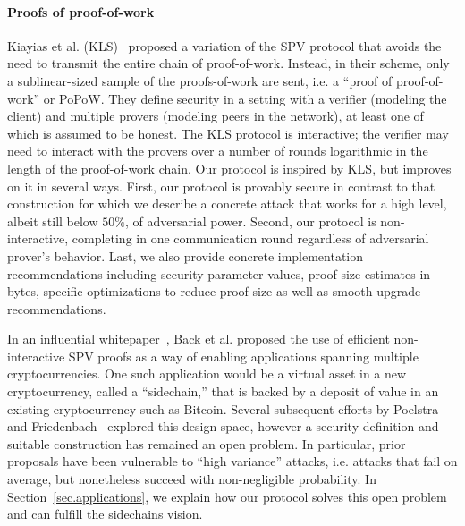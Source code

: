 \paragraph{Proofs of proof-of-work}
Kiayias et al. (KLS)~\cite{KLS} proposed a variation of the SPV protocol that
avoids the need to transmit the entire chain of proof-of-work. Instead, in
their scheme, only a sublinear-sized sample of the proofs-of-work are sent, i.e.
a ``proof of proof-of-work'' or PoPoW. They define security in a setting with a
verifier (modeling the client) and multiple provers (modeling peers in the
network), at least one of which is assumed to be honest. The KLS protocol is
interactive; the verifier may need to interact with the provers over a number
of rounds logarithmic in the length of the proof-of-work chain.
Our protocol is inspired by KLS, but improves on it in several ways. First, our
protocol is  provably secure in contrast to that construction for which we
describe a concrete attack that works for a high level, albeit still below $50\%$,
of adversarial power. Second, our protocol is non-interactive, completing
in one communication round regardless of adversarial prover's behavior. Last, we
also provide concrete implementation recommendations including security
parameter values, proof size estimates in bytes, specific optimizations to
reduce proof size as well as smooth upgrade recommendations.

In an influential whitepaper~\cite{sidechains}, Back et al. proposed the
use of efficient non-interactive SPV proofs as a way of enabling applications
spanning multiple cryptocurrencies. One such application would be a virtual
asset in a new cryptocurrency, called a ``sidechain,'' that is backed by a
deposit of value in an existing cryptocurrency such as Bitcoin.
Several subsequent efforts by
Poelstra~\cite{pos} and Friedenbach~\cite{compactspv} explored this design
space, however a security definition and suitable construction has remained an
open problem. In particular, prior proposals have been vulnerable to ``high
variance'' attacks, i.e. attacks that fail on average, but nonetheless succeed
with non-negligible probability. In Section~\ref{sec.applications}, we explain
how our protocol solves this open problem and can fulfill the sidechains
vision.


